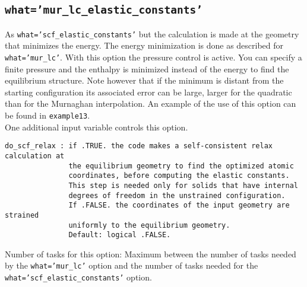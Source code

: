 \documentclass[12pt,a4paper]{article}
\begin{document}
\subsection{\color{web-blue}\texttt{what='mur\_lc\_elastic\_constants'}}
As \texttt{what='scf\_elastic\_constants'} but the calculation is made at the
geometry that minimizes the energy. The energy minimization is 
done as described for \texttt{what='mur\_lc'}. 
With this option the pressure control is active. You can specify a
finite pressure and the enthalpy is minimized instead of the
energy to find the equilibrium structure. Note however that if the 
minimum is distant from the starting configuration its associated error 
can be large, larger for the quadratic than for the Murnaghan interpolation. 
An example of the use of this 
option can be found in \texttt{example13}. \\
One additional input variable controls this option.
\begin{verbatim}
do_scf_relax : if .TRUE. the code makes a self-consistent relax calculation at
               the equilibrium geometry to find the optimized atomic 
               coordinates, before computing the elastic constants.
               This step is needed only for solids that have internal
               degrees of freedom in the unstrained configuration. 
               If .FALSE. the coordinates of the input geometry are strained 
               uniformly to the equilibrium geometry.
               Default: logical .FALSE. 
\end{verbatim}
Number of tasks for this option: Maximum between the number of tasks
needed by the \texttt{what='mur\_lc'} option and the number of tasks
needed for the \texttt{what='scf\_elastic\_constants'} option.

\end{document}
